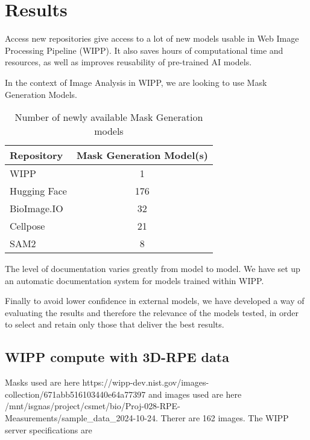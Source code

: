 \section{Results}
\label{sec:results}

Access new repositories give access to a lot of new models usable in Web Image
Processing Pipeline (WIPP). It also saves hours of computational time and
resources, as well as improves reusability of pre-trained AI models.

In the context of Image Analysis in WIPP, we are looking to use Mask
Generation Models.

\begin{table}[H]
\centering
\caption{\label{tab:number_of_newly_available_models}%
  Number of newly available Mask Generation models
}
\begin{tabular}{lc}
  \toprule
  Repository & Mask Generation Model(s) \\
  \midrule
  WIPP & 1 \\
  Hugging Face & 176 \\
  BioImage.IO & 32 \\
  Cellpose & 21 \\
  SAM2 & 8 \\
  \bottomrule
\end{tabular}
\end{table}

The level of documentation varies greatly from model to model. We have set up an
automatic documentation system for models trained within WIPP.

Finally to avoid lower confidence in external models, we have developed a way of
evaluating the results and therefore the relevance of the models tested, in
order to select and retain only those that deliver the best results.

\subsection{WIPP compute with 3D-RPE data}

Masks used are here
https://wipp-dev.nist.gov/images-collection/671abb516103440e64a77397 and images
used are here
/mnt/isgnas/project/csmet/bio/Proj-028-RPE-Measurements/sample\_data\_2024-10-24.
Therer are 162 images. The WIPP server specifications are \TODO\


